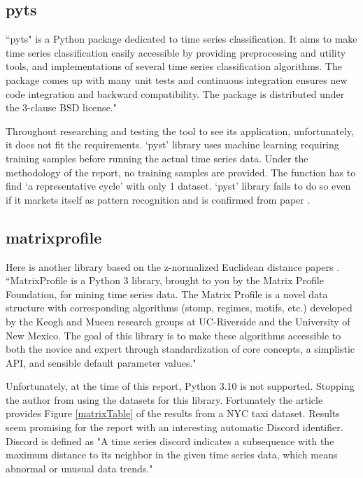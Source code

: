 \subsection{pyts}
``pyts" is a Python package dedicated to time series classification. It aims to make time series classification easily accessible by providing preprocessing and utility tools, and implementations of several time series classification algorithms. The package comes up with many unit tests and continuous integration ensures new code integration and backward compatibility. The package is distributed under the 3-clause BSD license." \cite{JMLR:v21:19-763}

Throughout researching and testing the tool to see its application, unfortunately, it does not fit the requirements. `pyst' library uses machine learning requiring training samples before running the actual time series data. Under the methodology of the report, no training samples are provided. The function has to find `a representative cycle' with only 1 dataset. `pyst' library fails to do so even if it markets itself as pattern recognition and is confirmed from paper \cite{DBLP:journals/corr/abs-2104-07406}.

\subsection{matrixprofile}

Here is another library based on the z-normalized Euclidean distance papers \cite{zhu_imamura_nikovski_keogh_2017}. 
``MatrixProfile is a Python 3 library, brought to you by the Matrix Profile Foundation, for mining time series data. The Matrix Profile is a novel data structure with corresponding algorithms (stomp, regimes, motifs, etc.) developed by the Keogh and Mueen research groups at UC-Riverside and the University of New Mexico. The goal of this library is to make these algorithms accessible to both the novice and expert through standardization of core concepts, a simplistic API, and sensible default parameter values." \cite{Van_Benschoten2020} 

Unfortunately, at the time of this report, Python 3.10 is not supported. Stopping the author from using the datasets for this library. Fortunately the article \cite{Van_Benschoten2020} provides Figure \ref{matrixTable} of the results from a NYC taxi dataset. Results seem promising for the report with an interesting automatic Discord identifier. Discord is defined as "A time series discord indicates a subsequence with the maximum distance to its neighbor in the given time series data, which means abnormal or unusual data trends."\cite{woodbridge_wilson_rintoul_goldstein_2015}

